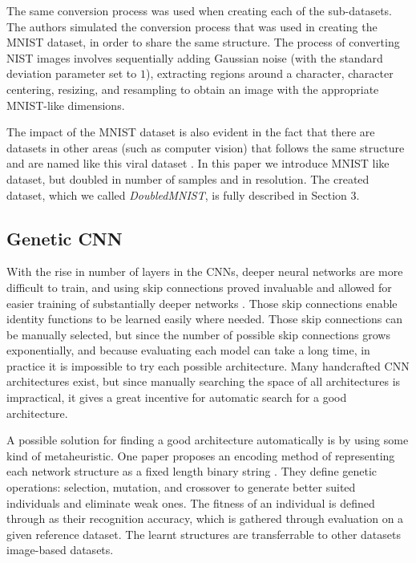 \documentclass[eng]{simposium}
\begin{document}
The same conversion process was used when creating each of the sub-datasets.  
The authors simulated the conversion process that was used in creating the MNIST dataset, in order  
to share the same structure.  
The process of converting NIST images involves sequentially adding Gaussian noise (with the standard deviation parameter set to $1$),  
extracting regions around a character, character centering, resizing, and resampling to obtain an image with the appropriate MNIST-like dimensions.  

The impact of the MNIST dataset is also evident in the fact that there are datasets in other areas (such as computer vision) that 
follows the same structure and are named like this viral dataset \cite{27}.  
In this paper we introduce MNIST like dataset, but doubled in number of samples and in resolution.  
The created dataset, which we called \textit{DoubledMNIST}, is fully described in Section 3.  

\subsection{Genetic CNN} 

With the rise in number of layers in the CNNs, deeper neural networks are more difficult to train, and using skip connections proved invaluable and allowed  
for easier training of substantially deeper networks \cite{6}. Those skip connections enable identity functions to be learned easily where needed. 
Those skip connections can be manually selected, but since the number of possible skip connections grows exponentially, and because evaluating each model can take a long time,  
in practice it is impossible to try each possible architecture. 
Many handcrafted CNN architectures exist, but since manually searching the space of all architectures is impractical, it gives a great incentive for automatic search  
for a good architecture. 

A possible solution for finding a good architecture automatically is by using some kind of metaheuristic.  
One paper proposes an encoding method of representing each network structure as a fixed length binary string \cite{4}.  
They define genetic operations: selection, mutation, and crossover to generate better suited individuals and eliminate weak ones. 
The fitness of an individual is defined through as their recognition accuracy, which is gathered through evaluation on a given reference dataset. 
The learnt structures are transferrable to other datasets image-based datasets. 
\end{document}
